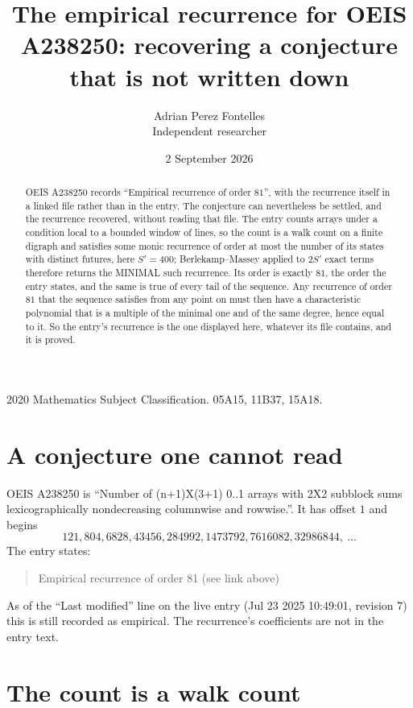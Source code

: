\documentclass[11pt,a4paper]{article}
\title{The empirical recurrence for OEIS A238250: recovering a conjecture that is not written down}
\author{Adrian Perez Fontelles\\ \small Independent researcher}
\date{2 September 2026}
\theoremstyle{plain}
\theoremstyle{definition}
\begin{document}
\maketitle

\begin{abstract}
OEIS A238250 records ``Empirical recurrence of order $81$'', with the recurrence itself in a
linked file rather than in the entry. The conjecture can nevertheless be settled, and the
recurrence recovered, without reading that file. The entry counts arrays under a condition
local to a bounded window of lines, so the count is a walk count on a finite digraph and
satisfies some monic recurrence of order at most the number of its states with distinct
futures, here $S'=400$; Berlekamp--Massey applied to $2S'$ exact
terms therefore returns the MINIMAL such recurrence. Its order is exactly $81$, the order
the entry states, and the same is true of every tail of the sequence. Any recurrence of order
$81$ that the sequence satisfies from any point on must then have a characteristic
polynomial that is a multiple of the minimal one and of the same degree, hence equal to it. So
the entry's recurrence is the one displayed here, whatever its file contains, and it is
proved.
\end{abstract}

\noindent\small 2020 Mathematics Subject Classification. 05A15, 11B37, 15A18.\normalsize

\section{A conjecture one cannot read}

OEIS A238250 is ``Number of (n+1)X(3+1) 0..1 arrays with 2X2 subblock sums lexicographically nondecreasing columnwise and rowwise.''. It has offset $1$ and begins
\[
121, 804, 6828, 43456, 284992, 1473792, 7616082, 32986844,\ \dots
\]
The entry states:
\begin{quote}
Empirical recurrence of order 81 (see link above)
\end{quote}
As of the ``Last modified'' line on the live entry (Jul 23 2025 10:49:01, revision 7) this is still
recorded as empirical. The recurrence's coefficients are not in the entry text.

\section{The count is a walk count}
\end{document}
